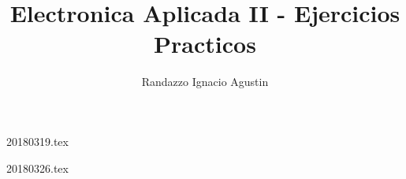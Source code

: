 

\title{Electronica Aplicada II - Ejercicios Practicos}
\author{Randazzo Ignacio Agustin}


\maketitle
\tableofcontents

{20180319.tex}

{20180326.tex}



